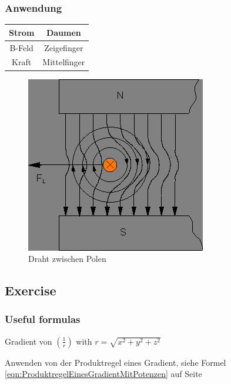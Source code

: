 \documentclass[a4paper]{scrartcl}
\begin{document}
\subsubsection{Anwendung}

\begin{center}
\begin{tabular}{|c|c|}

\hline Strom & Daumen \\ 
\hline B-Feld & Zeigefinger \\ 
\hline Kraft & Mittelfinger \\ 
\hline 

\end{tabular} 
\end{center}

\begin{figure}[h!]
\begin{center}
\includegraphics[scale=0.5]{images/DrahtZwischenPolen.png}
\caption{Draht zwischen Polen}
\label{fig:DrahtZwischenPolen}
\end{center}
\end{figure}


\subsection{Exercise}
\subsubsection{Useful formulas}

Gradient von $ (\frac{1}{r}) $  with $ r=\sqrt{x^2+y^2+z^2} $

Anwenden von der Produktregel eines Gradient, siehe Formel \ref{eqn:ProduktregelEinesGradientMitPotenzen} auf Seite \pageref{eqn:ProduktregelEinesGradientMitPotenzen}
\end{document}
